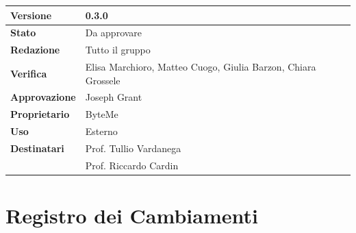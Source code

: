 \documentclass[11pt,a4paper]{article}
\begin{document}
\begin{titlepage}
    \begin{table}[H]
        \centering
        \begin{tabular}{|l|p{5cm}|}
            \hline
            \textbf{Versione} & 0.3.0 \\
            \hline
            \textbf{Stato} & Da approvare \\
            \hline
            \textbf{Redazione} & Tutto il gruppo \\
            \hline
            \textbf{Verifica} & Elisa Marchioro, Matteo Cuogo, Giulia Barzon, Chiara Grossele \\
            \hline
            \textbf{Approvazione} & Joseph Grant \\
            \hline
            \textbf{Proprietario} & ByteMe \\
            \hline
            \textbf{Uso} & Esterno \\
            \hline
            \textbf{Destinatari} & Prof. Tullio Vardanega \\ & Prof. Riccardo Cardin \\
            \hline
        \end{tabular}
    \end{table}
    
    \vfill
\end{titlepage}

\thispagestyle{empty}
\section*{Registro dei Cambiamenti}
\end{document}
